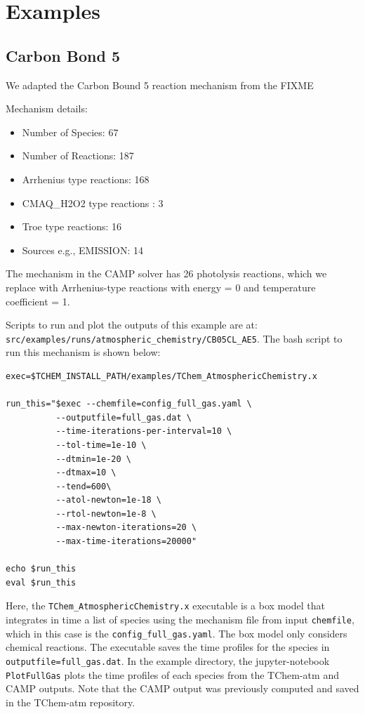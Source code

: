 \documentclass[report, 12pt]{SANDreport}
\begin{document}
\chapter{Examples}
\section{Carbon Bond 5}

We adapted the Carbon Bound 5 reaction mechanism from the FIXME

Mechanism details:

\begin{itemize}
\item Number of Species: 67
\item Number of Reactions: 187
\item Arrhenius type reactions: 168
\item CMAQ\_H2O2 type reactions : 3
\item Troe type reactions: 16
\item Sources e.g., EMISSION: 14
\end{itemize}

The mechanism in the CAMP solver has 26 photolysis reactions, which we replace with Arrhenius-type reactions with energy = 0  and temperature coefficient = 1.

Scripts to run and plot the outputs of this example are at: \verb|src/examples/runs/atmospheric_chemistry/CB05CL_AE5|. The bash script to run this mechanism is shown below:


\begin{verbatim}
exec=$TCHEM_INSTALL_PATH/examples/TChem_AtmosphericChemistry.x

run_this="$exec --chemfile=config_full_gas.yaml \
          --outputfile=full_gas.dat \
          --time-iterations-per-interval=10 \
          --tol-time=1e-10 \
          --dtmin=1e-20 \
          --dtmax=10 \
          --tend=600\
          --atol-newton=1e-18 \
          --rtol-newton=1e-8 \
          --max-newton-iterations=20 \
          --max-time-iterations=20000"

echo $run_this
eval $run_this
\end{verbatim}

Here, the \verb|TChem_AtmosphericChemistry.x| executable is a box model that integrates in time a list of species using the mechanism file from input \verb|chemfile|, which in this case is the \verb|config_full_gas.yaml|. The box model only considers chemical reactions. The executable saves the time profiles for the species in \verb|outputfile=full_gas.dat|. In the example directory, the jupyter-notebook \verb|PlotFullGas| plots the time profiles of each species from the TChem-atm and CAMP outputs. Note that the CAMP output was previously computed and saved in the TChem-atm repository.
\end{document}
